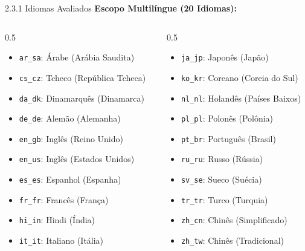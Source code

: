 \documentclass[aspectratio=169]{beamer}
\begin{document}
\begin{frame}{2.3.1 Idiomas Avaliados}
    \textbf{Escopo Multilíngue (20 Idiomas):}
    \vspace{0.2cm}
    
    \begin{columns}[T]
        \begin{column}{0.5\textwidth}
            \small
            \begin{itemize}
                \item \texttt{ar\_sa}: Árabe (Arábia Saudita)
                \item \texttt{cs\_cz}: Tcheco (República Tcheca)
                \item \texttt{da\_dk}: Dinamarquês (Dinamarca)
                \item \texttt{de\_de}: Alemão (Alemanha)
                \item \texttt{en\_gb}: Inglês (Reino Unido)
                \item \texttt{en\_us}: Inglês (Estados Unidos)
                \item \texttt{es\_es}: Espanhol (Espanha)
                \item \texttt{fr\_fr}: Francês (França)
                \item \texttt{hi\_in}: Hindi (Índia)
                \item \texttt{it\_it}: Italiano (Itália)
            \end{itemize}
        \end{column}
        \begin{column}{0.5\textwidth}
            \small
            \begin{itemize}
                \item \texttt{ja\_jp}: Japonês (Japão)
                \item \texttt{ko\_kr}: Coreano (Coreia do Sul)
                \item \texttt{nl\_nl}: Holandês (Países Baixos)
                \item \texttt{pl\_pl}: Polonês (Polônia)
                \item \texttt{pt\_br}: Português (Brasil)
                \item \texttt{ru\_ru}: Russo (Rússia)
                \item \texttt{sv\_se}: Sueco (Suécia)
                \item \texttt{tr\_tr}: Turco (Turquia)
                \item \texttt{zh\_cn}: Chinês (Simplificado)
                \item \texttt{zh\_tw}: Chinês (Tradicional)
            \end{itemize}
        \end{column}
    \end{columns}
\end{frame}
\end{document}
